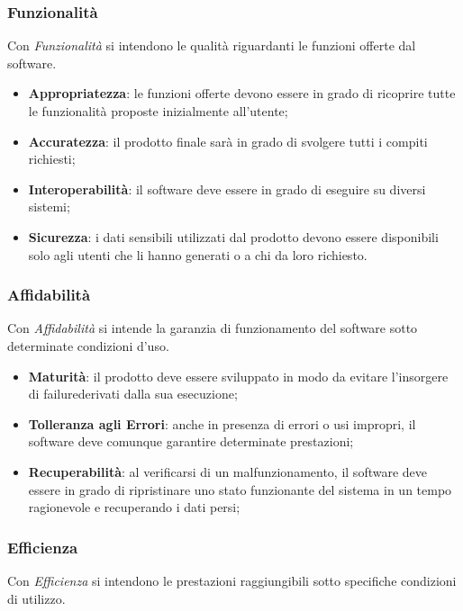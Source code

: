 \subsubsection{Funzionalità}

Con \textit{Funzionalità} si intendono le qualità riguardanti le funzioni offerte dal software.
\begin{itemize}
	\item \textbf{Appropriatezza}: le funzioni offerte devono essere in grado di ricoprire tutte le funzionalità proposte inizialmente all'utente;
	\item \textbf{Accuratezza}: il prodotto finale sarà in grado di svolgere tutti i compiti richiesti;
	\item \textbf{Interoperabilità}: il software deve essere in grado di eseguire su diversi sistemi;
	\item \textbf{Sicurezza}: i dati sensibili utilizzati dal prodotto devono essere disponibili solo agli utenti che li hanno generati o a chi da loro richiesto. 
\end{itemize}

\subsubsection{Affidabilità}

Con \textit{Affidabilità} si intende la garanzia di funzionamento del software sotto determinate condizioni d'uso. 

\begin{itemize}
	\item \textbf{Maturità}: il prodotto deve essere sviluppato in modo da evitare l'insorgere di failure\glossario derivati dalla sua esecuzione;
	\item \textbf{Tolleranza agli Errori}: anche in presenza di errori o usi impropri, il software deve comunque garantire determinate prestazioni;
	\item \textbf{Recuperabilità}: al verificarsi di un malfunzionamento, il software deve essere in grado di ripristinare uno stato funzionante del sistema in un tempo ragionevole e recuperando i dati persi;
\end{itemize}

\subsubsection{Efficienza}

Con \textit{Efficienza} si intendono le prestazioni raggiungibili sotto specifiche condizioni di utilizzo. 

